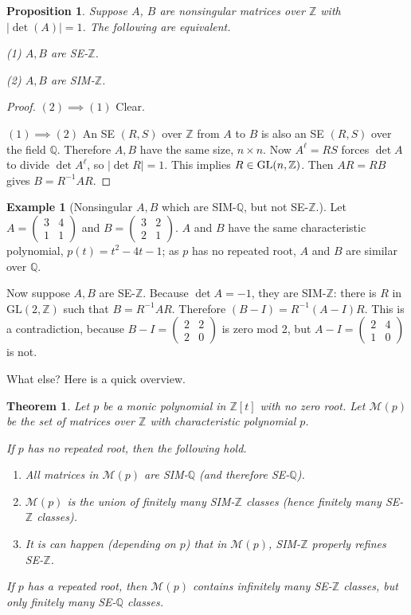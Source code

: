 \documentclass{amsart}
\newtheorem{thm}[equation]{Theorem}
\newtheorem{prop}[equation]{Proposition}
\theoremstyle{definition}
\newtheorem{ex}[equation]{Example}
\theoremstyle{definition}
\newcommand{\Z}{\mathbb Z}
\newcommand{\Q}{\mathbb Q}
\newcommand{\GL}{\textnormal{GL}}
\numberwithin{equation}{subsection}
\begin{document}
\begin{prop}Suppose $A$, $B$ are nonsingular matrices over
   $\Z$ with $|\det (A)|=1$. The following are equivalent.

   (1) $A,B$ are SE-$\Z$.

   (2) $A,B$ are SIM-$\Z$.
\end{prop}
\begin{proof} $(2) \implies (1)$ Clear.

 $(1) \implies (2)$
  An SE $(R,S)$ over $\Z$ from
   $A$ to $B$ is also an SE $(R,S)$ over the field $\Q$.
   Therefore    $A,B$ have the same size, $n\times n$.  Now
   $A^{\ell} = RS$ forces $\det A$ to divide $\det A^{\ell}$,
   so $|\det R| =1$. This implies $R\in \GL ( n, \Z)$.
   Then $AR=RB$ gives $B=R^{-1}AR$.
   \end{proof}
\begin{ex}[Nonsingular $A,B$ which are SIM-$\Q$, but not SE-$\Z$.]

   Let $A= \begin{pmatrix} 3&4\\1&1 \end{pmatrix}$
   and $B= \begin{pmatrix} 3&2\\2&1 \end{pmatrix}$. $A$ and $B$
   have the same characteristic polynomial, $p(t)= t^2 -4t-1$;
   as $p$ has
 no repeated root,
   $A$ and $B$  are similar over $\Q$.

   Now suppose $A,B$ are SE-$\Z$. Because
   $\det A = -1$, they are SIM-$\Z$: there is $R$ in
   $\text{GL}(2,\Z)$ such that $B=R^{-1}AR$. Therefore
   $(B-I)=R^{-1}(A-I)R$.
This is a contradiction, because
$B-I= \begin{pmatrix} 2&2\\2&0 \end{pmatrix}$ is zero mod 2, but
$A-I= \begin{pmatrix} 2&4\\1&0 \end{pmatrix}$ is not.
\end{ex}


What else?
Here is a quick overview.
\begin{thm}
Let $p$ be a monic polynomial in $\Z [t]$ with no zero root.
Let $\mathcal M(p)$ be the set of
matrices over $\Z$ with characteristic polynomial $p$.

If $p$ has no repeated root, then the following hold.
\begin{enumerate}
\item All matrices in $\mathcal M(p)$ are  SIM-$\Q$ (and therefore SE-$\Q$).

\item $\mathcal M(p) $ is the union of finitely many  SIM-$\Z$ classes
(hence finitely many SE-$\Z$ classes).

\item  It is can happen (depending on $p$) that in
 $\mathcal M(p)$, SIM-$\Z$  properly refines SE-$\Z$.
\end{enumerate}
If $p$ has a repeated root, then $\mathcal M(p) $
contains
infinitely many SE-$\Z$ classes, but only
finitely many SE-$\Q$ classes.
\end{thm}
\end{document}
